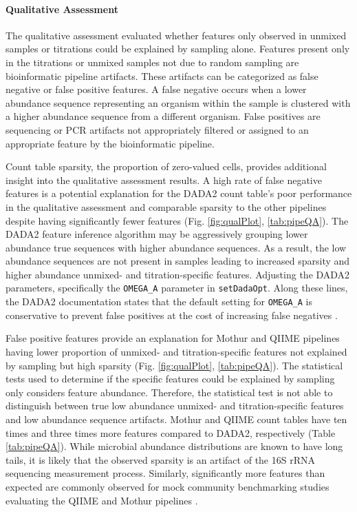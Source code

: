 \documentclass{bmcart}
\begin{document}
\paragraph*{Qualitative Assessment}

The qualitative assessment evaluated whether features only observed in
unmixed samples or titrations could be explained by sampling alone.
Features present only in the titrations or unmixed samples not due to
random sampling are bioinformatic pipeline artifacts. These artifacts
can be categorized as false negative or false positive features. A false
negative occurs when a lower abundance sequence representing an organism
within the sample is clustered with a higher abundance sequence from a
different organism. False positives are sequencing or PCR artifacts not
appropriately filtered or assigned to an appropriate feature by the
bioinformatic pipeline.

Count table sparsity, the proportion of zero-valued cells, provides
additional insight into the qualitative assessment results. A high rate
of false negative features is a potential explanation for the DADA2
count table's poor performance in the qualitative assessment and
comparable sparsity to the other pipelines despite having significantly
fewer features (Fig. \ref{fig:qualPlot}, \ref{tab:pipeQA}). The DADA2
feature inference algorithm may be aggressively grouping lower abundance
true sequences with higher abundance sequences. As a result, the low
abundance sequences are not present in samples leading to increased
sparsity and higher abundance unmixed- and titration-specific features.
Adjusting the DADA2 parameters, specifically the \texttt{OMEGA\_A}
parameter in \texttt{setDadaOpt}. Along these lines, the DADA2
documentation states that the default setting for \texttt{OMEGA\_A} is
conservative to prevent false positives at the cost of increasing false
negatives \cite{callahan2016dada2}.

False positive features provide an explanation for Mothur and QIIME
pipelines having lower proportion of unmixed- and titration-specific
features not explained by sampling but high sparsity (Fig.
\ref{fig:qualPlot}, \ref{tab:pipeQA}). The statistical tests used to
determine if the specific features could be explained by sampling only
considers feature abundance. Therefore, the statistical test is not able
to distinguish between true low abundance unmixed- and
titration-specific features and low abundance sequence artifacts. Mothur
and QIIME count tables have ten times and three times more features
compared to DADA2, respectively (Table \ref{tab:pipeQA}). While
microbial abundance distributions are known to have long tails, it is
likely that the observed sparsity is an artifact of the 16S rRNA
sequencing measurement process. Similarly, significantly more features
than expected are commonly observed for mock community benchmarking
studies evaluating the QIIME and Mothur pipelines
\cite{kozich2013development}.
\end{document}
